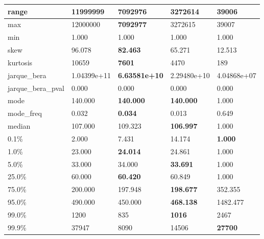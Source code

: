 \begin{table}[H]
\begin{tabular}{|l|m{10em}|m{10em}|m{10em}|m{10em}|}
\hline range & 11999999 & \bfseries 7092976 & 3272614 & \cellcolor[rgb]{0.9, 0.54, 0.52} 39006 \\
\hline max & 12000000 & \bfseries 7092977 & 3272615 & \cellcolor[rgb]{0.9, 0.54, 0.52} 39007 \\
\hline min & 1.000 & 1.000 & 1.000 & 1.000 \\
\hline skew & 96.078 & \bfseries 82.463 & 65.271 & \cellcolor[rgb]{0.9, 0.54, 0.52} 12.513 \\
\hline kurtosis & 10659 & \bfseries 7601 & 4470 & \cellcolor[rgb]{0.9, 0.54, 0.52} 189 \\
\hline jarque\_bera & 1.04399e+11 & \bfseries 6.63581e+10 & 2.29480e+10 & \cellcolor[rgb]{0.9, 0.54, 0.52} 4.04868e+07 \\
\hline jarque\_bera\_pval & 0.000 & 0.000 & 0.000 & 0.000 \\
\hline mode & 140.000 & \bfseries 140.000 & \bfseries 140.000 & \cellcolor[rgb]{0.9, 0.54, 0.52} 1.000 \\
\hline mode\_freq & 0.032 & \bfseries 0.034 & 0.013 & \cellcolor[rgb]{0.9, 0.54, 0.52} 0.649 \\
\hline median & 107.000 & 109.323 & \bfseries 106.997 & \cellcolor[rgb]{0.9, 0.54, 0.52} 1.000 \\
\hline 0.1\% & 2.000 & 7.431 & \cellcolor[rgb]{0.9, 0.54, 0.52} 14.174 & \bfseries 1.000 \\
\hline 1.0\% & 23.000 & \bfseries 24.014 & 24.861 & \cellcolor[rgb]{0.9, 0.54, 0.52} 1.000 \\
\hline 5.0\% & 33.000 & 34.000 & \bfseries 33.691 & \cellcolor[rgb]{0.9, 0.54, 0.52} 1.000 \\
\hline 25.0\% & 60.000 & \bfseries 60.420 & 60.849 & \cellcolor[rgb]{0.9, 0.54, 0.52} 1.000 \\
\hline 75.0\% & 200.000 & 197.948 & \bfseries 198.677 & \cellcolor[rgb]{0.9, 0.54, 0.52} 352.355 \\
\hline 95.0\% & 490.000 & 450.000 & \bfseries 468.138 & \cellcolor[rgb]{0.9, 0.54, 0.52} 1482.477 \\
\hline 99.0\% & 1200 & 835 & \bfseries 1016 & \cellcolor[rgb]{0.9, 0.54, 0.52} 2467 \\
\hline 99.9\% & 37947 & \cellcolor[rgb]{0.9, 0.54, 0.52} 8090 & 14506 & \bfseries 27700 \\
\hline
\end{tabular}
\end{table}
